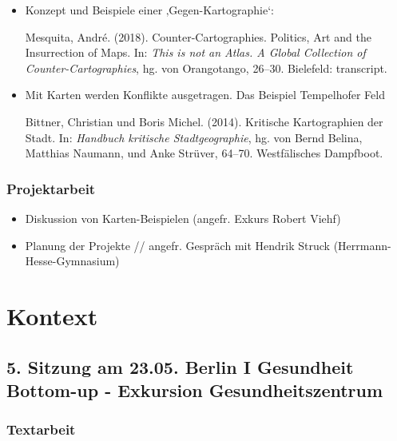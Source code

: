 \documentclass[
  ngerman,
]{article}
\providecommand{\tightlist}{%
  \setlength{\itemsep}{0pt}\setlength{\parskip}{0pt}}
\begin{document}
\begin{itemize}
\item
  Konzept und Beispiele einer ‚Gegen-Kartographie`:

  Mesquita, André. (2018). Counter-Cartographies. Politics, Art and the Insurrection of Maps. In: \emph{This is not an Atlas. A Global Collection of Counter-Cartographies}, hg. von Orangotango, 26--30. Bielefeld: transcript.
\item
  Mit Karten werden Konflikte ausgetragen. Das Beispiel Tempelhofer Feld

  Bittner, Christian und Boris Michel. (2014). Kritische Kartographien der Stadt. In: \emph{Handbuch kritische Stadtgeographie}, hg. von Bernd Belina, Matthias Naumann, und Anke Strüver, 64--70. Westfälisches Dampfboot.
\end{itemize}

\hypertarget{projektarbeit-2}{%
\subsubsection*{Projektarbeit}\label{projektarbeit-2}}

\begin{itemize}
\tightlist
\item
  Diskussion von Karten-Beispielen (angefr. Exkurs Robert Viehf)
\item
  Planung der Projekte // angefr. Gespräch mit Hendrik Struck (Herrmann-Hesse-Gymnasium)
\end{itemize}

\hypertarget{kontext}{%
\section*{Kontext}\label{kontext}}

\hypertarget{sitzung-am-23.05.-berlin-i-gesundheit-bottom-up---exkursion-gesundheitszentrum}{%
\subsection*{5. Sitzung am 23.05. \textbar{} Berlin I Gesundheit Bottom-up - Exkursion Gesundheitszentrum}\label{sitzung-am-23.05.-berlin-i-gesundheit-bottom-up---exkursion-gesundheitszentrum}}

\hypertarget{textarbeit-4}{%
\subsubsection*{Textarbeit}\label{textarbeit-4}}
\end{document}
